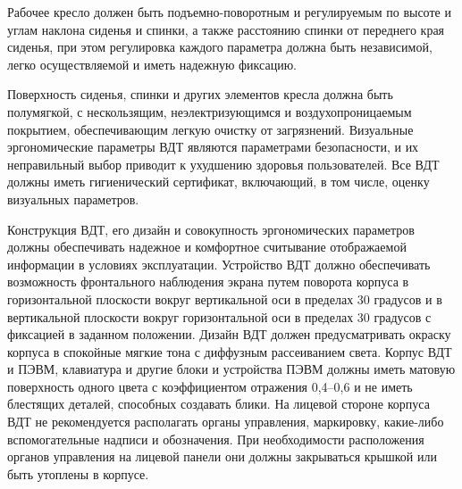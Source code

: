 Рабочее кресло должен быть подъемно-поворотным и регулируемым по высоте и углам наклона сиденья и спинки, а также расстоянию спинки от переднего края сиденья, при этом регулировка каждого параметра должна быть независимой, легко осуществляемой и иметь надежную фиксацию.

Поверхность сиденья, спинки и других элементов кресла должна быть полумягкой, с нескользящим, неэлектризующимся и воздухопроницаемым покрытием, обеспечивающим легкую очистку от загрязнений.
Визуальные эргономические параметры ВДТ являются параметрами безопасности, и их неправильный выбор приводит к ухудшению здоровья пользователей. Все ВДТ должны иметь гигиенический сертификат, включающий, в том числе, оценку визуальных параметров.

Конструкция ВДТ, его дизайн и совокупность эргономических параметров должны обеспечивать надежное и комфортное считывание отображаемой информации в условиях эксплуатации. Устройство ВДТ должно обеспечивать возможность фронтального наблюдения экрана путем поворота корпуса в горизонтальной плоскости вокруг вертикальной оси в пределах 30 градусов и в вертикальной плоскости вокруг горизонтальной оси в пределах 30 градусов с фиксацией в заданном положении. Дизайн ВДТ должен предусматривать окраску корпуса в спокойные мягкие тона с диффузным рассеиванием света. Корпус ВДТ и ПЭВМ, клавиатура и другие блоки и устройства ПЭВМ должны иметь матовую поверхность одного цвета с коэффициентом отражения 0,4--0,6 и не иметь блестящих деталей, способных создавать блики. На лицевой стороне корпуса ВДТ не рекомендуется располагать органы управления, маркировку, какие-либо вспомогательные надписи и обозначения. При необходимости расположения органов управления на лицевой панели они должны закрываться крышкой или быть утоплены в корпусе.

